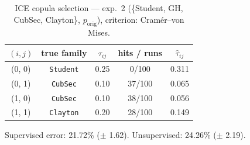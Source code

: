 \begin{table}[htbp]
  \centering
  \caption{ICE copula selection — exp.\ 2 (\{Student, GH, CubSec, Clayton\}, $p_{\text{orig}}$), criterion: Cram\'er--von Mises.}
  \label{tab:exp3-exp2_orig_p__cvm}
  \begin{tabular}{ccccc}
    \toprule
    $(i, j)$ & true family & $\tau_{ij}$ & hits / runs & $\hat\tau_{ij}$ \\
    \midrule
    (0, 0) & \texttt{Student} & 0.25 & 0/100 & 0.311 \\
    (0, 1) & \texttt{CubSec} & 0.10 & 37/100 & 0.065 \\
    (1, 0) & \texttt{CubSec} & 0.10 & 38/100 & 0.056 \\
    (1, 1) & \texttt{Clayton} & 0.20 & 28/100 & 0.149 \\
    \bottomrule
  \end{tabular}
  \par\smallskip Supervised error: 21.72\% ($\pm$ 1.62). Unsupervised: 24.26\% ($\pm$ 2.19).
\end{table}

